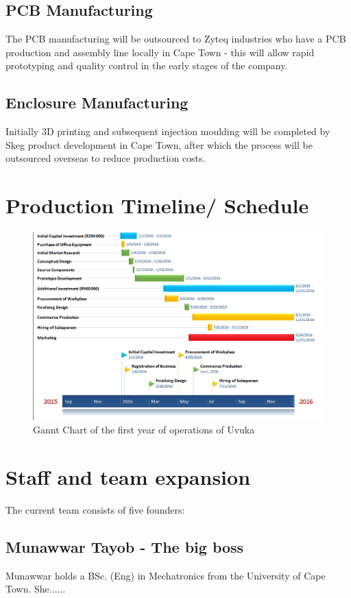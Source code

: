 \newpage
\subsection{PCB Manufacturing}
The PCB manufacturing will be outsourced to Zyteq industries who have a PCB production and assembly line locally in Cape Town - this will allow rapid prototyping and quality control in the early stages of the company.

\subsection{Enclosure Manufacturing}
Initially 3D printing and subsequent injection moulding will be completed by Skeg product development in Cape Town, after which the process will be outsourced overseas to reduce production costs. 

\section{Production Timeline/ Schedule}
\begin{figure}[H]
\centering
\includegraphics[width=1\textwidth]{Gantt_2016.PNG}
\vskip10pt
\caption[Gannt Chart of the first year of operations of Uvuka]{Gannt Chart of the first year of operations of Uvuka}
\label{fig:Gantt Chart 1}
\end{figure}


\section{Staff and team expansion} 

The current team consists of five founders:
\subsection{Munawwar Tayob - The big boss}
Munawwar holds a BSc. (Eng) in Mechatronics from the University of Cape Town. She......

